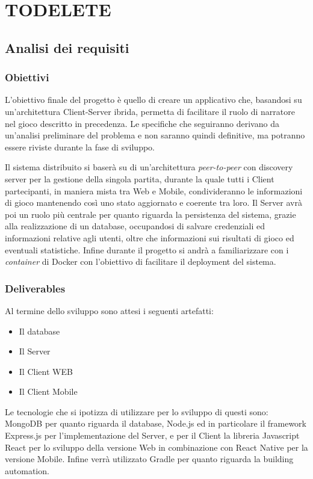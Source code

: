 \chapter*{TODELETE}
\section{Analisi dei requisiti}
\subsection{Obiettivi}
L'obiettivo finale del progetto è quello di creare un applicativo che, basandosi su un'architettura Client-Server ibrida, permetta di facilitare il ruolo di narratore nel gioco descritto in precedenza.
Le specifiche che seguiranno derivano da un'analisi preliminare del problema e non saranno quindi definitive, ma potranno essere riviste durante la fase di sviluppo.

Il sistema distribuito si baserà su di un'architettura \textit{peer-to-peer} con discovery server per la gestione della singola partita, durante la quale tutti i Client partecipanti, in maniera mista tra Web e Mobile, condivideranno le informazioni di gioco mantenendo così uno stato aggiornato e coerente tra loro.
Il Server avrà poi un ruolo più centrale per quanto riguarda la persistenza del sistema, grazie alla realizzazione di un database, occupandosi di salvare credenziali ed informazioni relative agli utenti, oltre che informazioni sui risultati di gioco ed eventuali statistiche. Infine durante il progetto si andrà a familiarizzare con i \textit{container} di Docker con l'obiettivo di facilitare il deployment del sistema. 

\subsection{Deliverables}
Al termine dello sviluppo sono attesi i seguenti artefatti:

\begin{itemize}
    \item Il database
    \item Il Server
    \item Il Client WEB
    \item Il Client Mobile
\end{itemize}
Le tecnologie che si ipotizza di utilizzare per lo sviluppo di questi sono: MongoDB per quanto riguarda il database, Node.js ed in particolare il framework Express.js per l'implementazione del Server, e per  il Client la libreria Javascript React per lo sviluppo della versione Web in combinazione con React Native per la versione Mobile. Infine verrà utilizzato Gradle per quanto riguarda la building automation.

